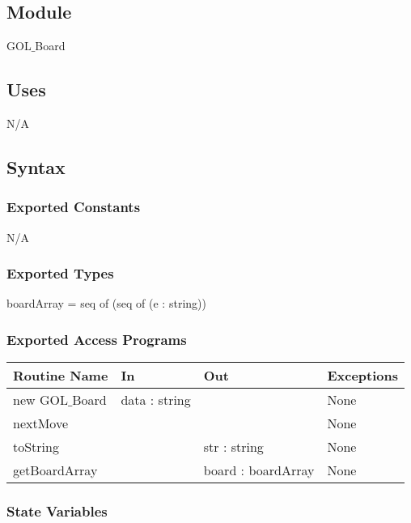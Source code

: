 \documentclass{article}
\begin{document}
\subsection*{Module}
GOL$\_$Board

\subsection*{Uses}
N/A
\subsection*{Syntax}

\subsubsection* {Exported Constants}
N/A

\subsubsection* {Exported Types}
boardArray = seq of (seq of (e : string))
\subsubsection* {Exported Access Programs}

\begin{table}[!ht]
    \begin{tabular}{|l|l|l|l|}
        \hline
        Routine Name     & In            & Out                                  & Exceptions \\ \hline
        new GOL$\_$Board & data : string & ~                                    & None       \\ \hline
        nextMove         & ~             & ~                                    & None       \\ \hline
        toString         & ~             & str : string                         & None       \\ \hline
        getBoardArray    & ~             & board : boardArray & None~          \\
        \hline
    \end{tabular}
\end{table}

\subsubsection* {State Variables}
\end{document}
